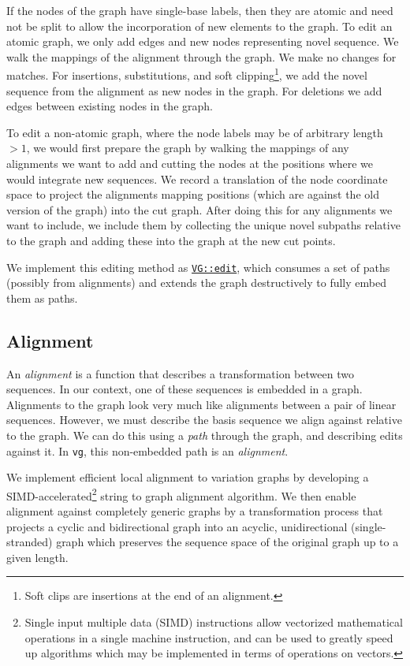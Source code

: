 \documentclass[12pt]{article}
\begin{document}
If the nodes of the graph have single-base labels, then they are atomic and need not be split to allow the incorporation of new elements to the graph.
To edit an atomic graph, we only add edges and new nodes representing novel sequence.
We walk the mappings of the alignment through the graph.
We make no changes for matches.
For insertions, substitutions, and soft clipping\footnote{Soft clips are insertions at the end of an alignment.}, we add the novel sequence from the alignment as new nodes in the graph.
For deletions we add edges between existing nodes in the graph.

To edit a non-atomic graph, where the node labels may be of arbitrary length $> 1$, we would first prepare the graph by walking the mappings of any alignments we want to add and cutting the nodes at the positions where we would integrate new sequences.
We record a translation of the node coordinate space to project the alignments mapping positions (which are against the old version of the graph) into the cut graph.
After doing this for any alignments we want to include, we include them by collecting the unique novel subpaths relative to the graph and adding these into the graph at the new cut points.

We implement this editing method as \href{https://github.com/vgteam/vg/blob/fbcb6e62/src/vg.cpp#L4846-L4912}{{\tt VG::edit}}, which consumes a set of paths (possibly from alignments) and extends the graph destructively to fully embed them as paths.

\subsection{Alignment}

An \emph{alignment} is a function that describes a transformation between two sequences.
In our context, one of these sequences is embedded in a graph.
Alignments to the graph look very much like alignments between a pair of linear sequences.
However, we must describe the basis sequence we align against relative to the graph.
We can do this using a \emph{path} through the graph, and describing edits against it.
In {\tt vg}, this non-embedded path is an \emph{alignment}.

We implement efficient local alignment to variation graphs by developing a SIMD-accelerated\footnote{Single input multiple data (SIMD) instructions allow vectorized mathematical operations in a single machine instruction, and can be used to greatly speed up algorithms which may be implemented in terms of operations on vectors.} string to graph alignment algorithm. We then enable alignment against completely generic graphs by a transformation process that projects a cyclic and bidirectional graph into an acyclic, unidirectional (single-stranded) graph which preserves the sequence space of the original graph up to a given length.
\end{document}
